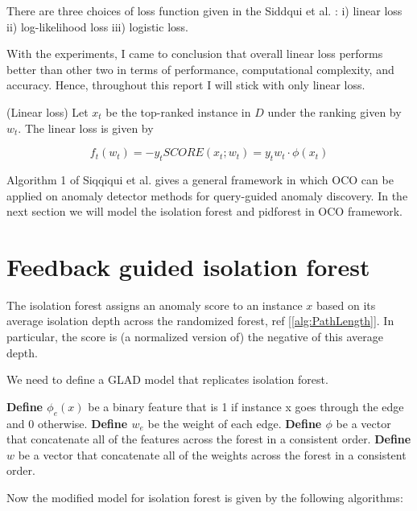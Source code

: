 There are three choices of loss function given in the Siddqui et al. \cite{10.1145/3219819.3220083}: i) linear loss ii) log-likelihood loss iii) logistic loss. 

With the experiments, I came to conclusion that overall linear loss performs better than other two in terms of performance, computational complexity, and accuracy. Hence, throughout this report I will stick with only linear loss.

\begin{defn}
    \label{defn:linear-loss}
    (Linear loss)
    Let $x_t$ be the top-ranked instance in $D$ under the ranking given by $w_t$. The linear loss is given by 

    \vspace{-2em}
    \begin{equation}
        \label{eq:linear-loss}
        f_t(w_t) = -y_t SCORE(x_t;w_t) = y_t w_t \cdot \phi (x_t)
    \end{equation}
\end{defn}

Algorithm 1 of Siqqiqui et al. \cite{10.1145/3219819.3220083} gives a general framework in which OCO can be applied on anomaly detector methods for query-guided anomaly discovery. In the next section we will model the isolation forest and pidforest in OCO framework.


\section{Feedback guided isolation forest}

The isolation forest assigns an anomaly score to an instance $x$ based on its average isolation depth across the randomized forest, ref [\ref{alg:PathLength}]. 
In particular, the score is (a normalized version of) the negative of
this average depth.

We need to define a GLAD model that replicates isolation forest.

\textbf{Define $\phi_e(x)$} be a binary feature that is 1 if instance x goes through the edge and 0 otherwise.
\textbf{Define $w_e$} be the weight of each edge.
\textbf{Define $\phi$}  be a vector that concatenate all of the features across the forest in a consistent order.
\textbf{Define $w$}  be a vector that concatenate all of the weights across the forest in a consistent order.

Now the modified model for isolation forest is given by the following algorithms:



